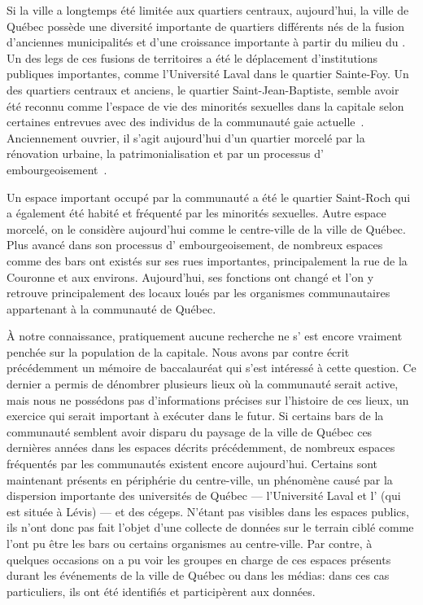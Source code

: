 Si la ville a longtemps été limitée aux quartiers centraux, aujourd'hui, la ville de Québec possède une diversité importante de quartiers différents nés de la fusion d'anciennes municipalités et d'une croissance importante à partir du milieu du .
Un des legs de ces fusions de territoires a été le déplacement d'institutions publiques importantes, comme l'Université Laval dans le quartier Sainte-Foy.
Un des quartiers centraux et anciens, le quartier Saint-Jean-Baptiste, semble avoir été reconnu comme l'espace de vie des minorités sexuelles dans la capitale selon certaines entrevues avec des individus de la communauté gaie actuelle~\citep{CSJB2011}.
Anciennement ouvrier, il s'agit aujourd'hui d'un quartier morcelé par la rénovation urbaine, la patrimonialisation et par un processus d’ embourgeoisement~\citep{Hatvany2005,Mercier2014}.

Un espace important occupé par la communauté \lgbt{} a été le quartier Saint-Roch qui a également été habité et fréquenté par les minorités sexuelles.
Autre espace morcelé, on le considère aujourd'hui comme le centre-ville de la ville de Québec.
Plus avancé dans son processus d’ embourgeoisement, de nombreux espaces \lgbt{} comme des bars ont existés sur ses rues importantes, principalement la rue de la Couronne et aux environs.
Aujourd'hui, ses fonctions ont changé et l'on y retrouve principalement des locaux loués par les organismes communautaires appartenant à la communauté \lgbt{} de Québec.

À notre connaissance, pratiquement aucune recherche ne s’ est encore vraiment penchée sur la population \lgbt{} de la capitale.
Nous avons par contre écrit précédemment un mémoire de baccalauréat qui s'est intéressé à cette question.
Ce dernier a permis de dénombrer plusieurs lieux où la communauté serait active, mais nous ne possédons pas d'informations précises sur l'histoire de ces lieux, un exercice qui serait important à exécuter dans le futur.
Si certains bars de la communauté semblent avoir disparu du paysage de la ville de Québec ces dernières années dans les espaces décrits précédemment, de nombreux espaces fréquentés par les communautés \lgbt{} existent encore aujourd'hui.
Certains sont maintenant présents en périphérie du centre-ville, un phénomène causé par la dispersion importante des universités de Québec --- l'Université Laval et l'\uqar{} (qui est située à Lévis) --- et des cégeps.
N'étant pas visibles dans les espaces publics, ils n'ont donc pas fait l'objet d'une collecte de données sur le terrain ciblé comme l'ont pu être les bars ou certains organismes au centre-ville.
Par contre, à quelques occasions on a pu voir les groupes en charge de ces espaces présents durant les événements \lgbt{} de la ville de Québec ou dans les médias: dans ces cas particuliers, ils ont été identifiés et participèrent aux données.

